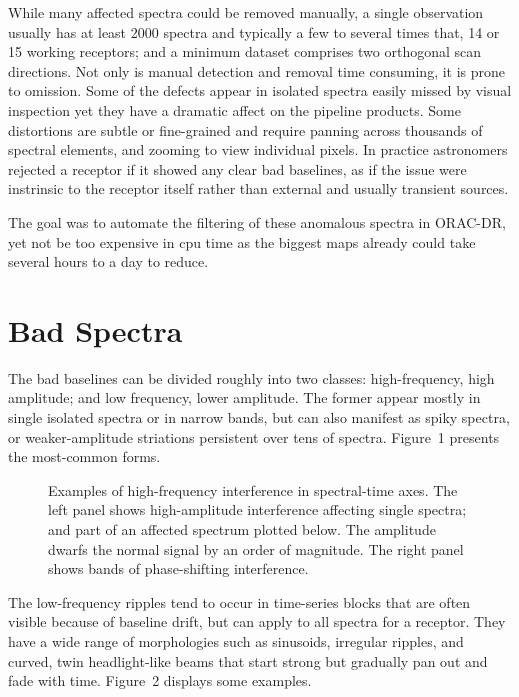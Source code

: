 \documentclass[11pt,twoside]{article}
\begin{document}
While many affected spectra could be removed manually, a single 
observation usually has at least 2000 spectra and typically a few to 
several times that, 14 or 15 working receptors; and a minimum dataset 
comprises two orthogonal scan directions.  Not only is manual detection 
and removal time consuming, it is prone to omission.  Some of the 
defects appear in isolated spectra easily missed by visual inspection 
yet they have a dramatic affect on the pipeline products.  Some 
distortions are subtle or fine-grained and require panning across 
thousands of spectral elements, and zooming to view individual pixels.  
In practice astronomers rejected a receptor if it showed any clear bad 
baselines, as if the issue were instrinsic to the receptor itself rather 
than external and usually transient sources.

The goal was to automate the filtering of these anomalous spectra in 
ORAC-DR, yet not be too expensive in cpu time as the biggest maps
already could take several hours to a day to reduce.

\section{Bad Spectra}

The bad baselines can be divided roughly into two classes: 
high-frequency, high amplitude; and low frequency, lower amplitude. The 
former appear mostly in single isolated spectra or in narrow bands,
but can also manifest as spiky spectra, or weaker-amplitude striations 
persistent over tens of spectra.  Figure~1 presents the most-common forms.

\begin{figure}[!ht]
\caption{Examples of high-frequency interference in spectral-time axes. 
The left panel shows high-amplitude interference affecting single
spectra; and part of an affected spectrum plotted below. The amplitude
dwarfs the normal signal by an order of magnitude. The right panel shows 
bands of phase-shifting interference.}
\end{figure}

The low-frequency ripples tend to occur in time-series blocks that are
often visible because of baseline drift, but can apply to all spectra
for a receptor. They have a wide range of morphologies such as
sinusoids, irregular ripples, and curved, twin headlight-like beams
that start strong but gradually pan out and fade with time.  Figure~2
displays some examples.
\end{document}
